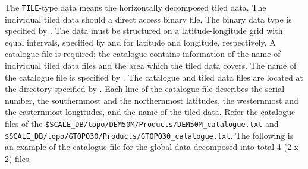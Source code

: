 The \verb|TILE|-type data means the horizontally decomposed tiled data.
The individual tiled data should a direct access binary file.
The binary data type is specified by .
The data must be structured on a latitude-longitude grid with equal intervals, specified by  and  for latitude and longitude, respectively.
A catalogue file is required; the catalogue contains information of the name of individual tiled data files and the area which the tiled data covers.
The name of the catalogue file is specified by .
The catalogue and tiled data files are located at the directory specified by .
Each line of the catalogue file describes the serial number, the southernmost and the northernmost latitudes, the westernmost and the easternmost longitudes, and the name of the tiled data.
Refer the catalogue files of the \verb|$SCALE_DB/topo/DEM50M/Products/DEM50M_catalogue.txt| and \\
\verb|$SCALE_DB/topo/GTOPO30/Products/GTOPO30_catalogue.txt|.
The following is an example of the catalogue file for the global data decomposed into total 4 (2 x 2) files.


